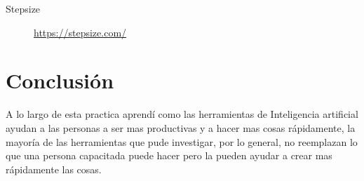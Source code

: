 \documentclass[11pt]{article}
\begin{document}
\begin{description}
\item[{Stepsize}] \url{https://stepsize.com/}
\end{description}





\section{Conclusión}
\label{sec:org79b2e0e}
A lo largo de esta practica aprendí como las herramientas de
Inteligencia artificial ayudan a las personas a ser mas productivas y
a hacer mas cosas rápidamente, la mayoría de las herramientas que pude
investigar, por lo general, no reemplazan lo que una persona capacitada
puede hacer pero la pueden ayudar a crear mas rápidamente las cosas.
\end{document}

